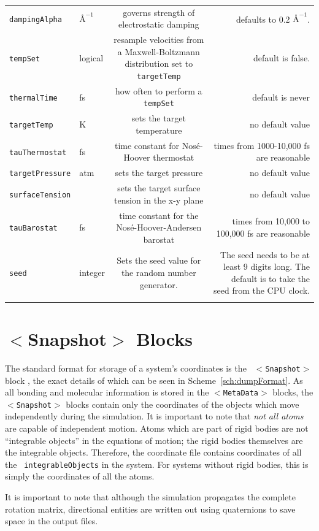 \documentclass[]{book}
\begin{document}
\begin{longtable}[c]{ABCD}
{\tt dampingAlpha} & $\mbox{\AA}^{-1}$ & governs strength of
electrostatic damping & defaults to 0.2 $\mbox{\AA}^{-1}$. \\
{\tt tempSet} & logical & resample velocities from a Maxwell-Boltzmann
distribution set to {\tt targetTemp} & default is false. \\
{\tt thermalTime} & fs & how often to perform a {\tt tempSet} &
default is never \\
{\tt targetTemp} & K & sets the target temperature & no default value \\
{\tt tauThermostat} & fs & time constant for Nos\'{e}-Hoover
thermostat & times from 1000-10,000 fs are reasonable \\
{\tt targetPressure} & atm & sets the target pressure & no default value\\
{\tt surfaceTension} &  & sets the target surface tension in the x-y
plane & no default value \\
{\tt tauBarostat} & fs & time constant for the
Nos\'{e}-Hoover-Andersen barostat & times from 10,000 to 100,000 fs
are reasonable \\
{\tt seed } & integer & Sets the seed value for the random number generator. & The seed needs to be at least 9 digits long. The default is to take the seed from the CPU clock. \\
\label{table:genParams}
\end{longtable}


\section{\label{section:coordFiles}$<$Snapshot$>$ Blocks}

The standard format for storage of a system's coordinates is the {\tt
$<$Snapshot$>$} block , the exact details of which can be seen in
Scheme~\ref{sch:dumpFormat}. As all bonding and molecular information
is stored in the {\tt $<$MetaData$>$} blocks, the {\tt $<$Snapshot$>$} blocks
contain only the coordinates of the objects which move independently
during the simulation.  It is important to note that {\it not all
atoms} are capable of independent motion.  Atoms which are part of
rigid bodies are not ``integrable objects'' in the equations of
motion; the rigid bodies themselves are the integrable objects.
Therefore, the coordinate file contains coordinates of all the {\tt
integrableObjects} in the system.  For systems without rigid bodies,
this is simply the coordinates of all the atoms.

It is important to note that although the simulation propagates the
complete rotation matrix, directional entities are written out using
quaternions to save space in the output files.
\end{document}
